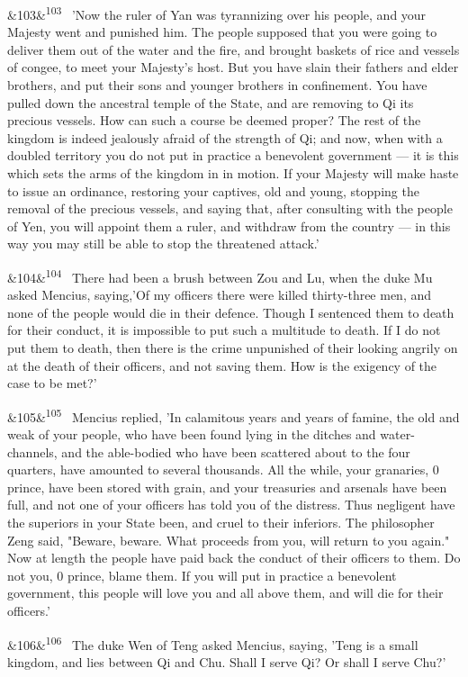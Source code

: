 \documentclass[12pt]{article}
\newcommand{\para}[1][]{\par\noindent\ifx&#1&\else\textsuperscript{\footnotesize #1}~\fi}
\begin{document}
\para[103] 'Now the ruler of Yan was tyrannizing over his people, and your Majesty went and punished him. The people supposed that you were going to deliver them out of the water and the fire, and brought baskets of rice and vessels of congee, to meet your Majesty's host. But you have slain their fathers and elder brothers, and put their sons and younger brothers in confinement. You have pulled down the ancestral temple of the State, and are removing to Qi its precious vessels. How can such a course be deemed proper? The rest of the kingdom is indeed jealously afraid of the strength of Qi; and now, when with a doubled territory you do not put in practice a benevolent government --- it is this which sets the arms of the kingdom in in motion. If your Majesty will make haste to issue an ordinance, restoring your captives, old and young, stopping the removal of the precious vessels, and saying that, after consulting with the people of Yen, you will appoint them a ruler, and withdraw from the country --- in this way you may still be able to stop the threatened attack.'

\para[104] There had been a brush between Zou and Lu, when the duke Mu asked Mencius, saying,'Of my officers there were killed thirty-three men, and none of the people would die in their defence. Though I sentenced them to death for their conduct, it is impossible to put such a multitude to death. If I do not put them to death, then there is the crime unpunished of their looking angrily on at the death of their officers, and not saving them. How is the exigency of the case to be met?'

\para[105] Mencius replied, 'In calamitous years and years of famine, the old and weak of your people, who have been found lying in the ditches and water-channels, and the able-bodied who have been scattered about to the four quarters, have amounted to several thousands. All the while, your granaries, 0 prince, have been stored with grain, and your treasuries and arsenals have been full, and not one of your officers has told you of the distress. Thus negligent have the superiors in your State been, and cruel to their inferiors. The philosopher Zeng said, "Beware, beware. What proceeds from you, will return to you again." Now at length the people have paid back the conduct of their officers to them. Do not you, 0 prince, blame them. If you will put in practice a benevolent government, this people will love you and all above them, and will die for their officers.'

\para[106] The duke Wen of Teng asked Mencius, saying, 'Teng is a small kingdom, and lies between Qi and Chu. Shall I serve Qi? Or shall I serve Chu?'
\end{document}
